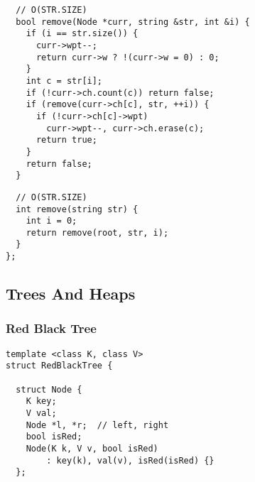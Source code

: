 \documentclass[twoside]{article}
\begin{document}
\begin{multicols*}{2}
\begin{verbatim}
  // O(STR.SIZE)
  bool remove(Node *curr, string &str, int &i) {
    if (i == str.size()) {
      curr->wpt--;
      return curr->w ? !(curr->w = 0) : 0;
    }
    int c = str[i];
    if (!curr->ch.count(c)) return false;
    if (remove(curr->ch[c], str, ++i)) {
      if (!curr->ch[c]->wpt)
        curr->wpt--, curr->ch.erase(c);
      return true;
    }
    return false;
  }
\end{verbatim}
\vspace{-12pt}
\begin{verbatim}
  // O(STR.SIZE)
  int remove(string str) {
    int i = 0;
    return remove(root, str, i);
  }
};
\end{verbatim}

\subsectionfont{\bfseries\sffamily\centering\LARGE}
\vspace{0em}
\subsection*{Trees And Heaps}
\vspace{2em}
\subsubsectionfont{\large\bfseries\sffamily\underline}
\subsubsection*{Red Black Tree}
\begin{verbatim}
template <class K, class V>
struct RedBlackTree {

  struct Node {
    K key;
    V val;
    Node *l, *r;  // left, right
    bool isRed;
    Node(K k, V v, bool isRed)
        : key(k), val(v), isRed(isRed) {}
  };


\end{verbatim}
\end{multicols*}
\end{document}
